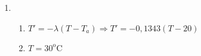 \documentclass[a4paper]{article}
\begin{document}
\begin{enumerate}

\item 
  \begin{enumerate}
  \item $T' = -\lambda(T-T_a) \Rightarrow T' = -0,1343(T-20)$
  \item $T=30^\text{o}$C
  \end{enumerate}






\end{enumerate}
\end{document}
